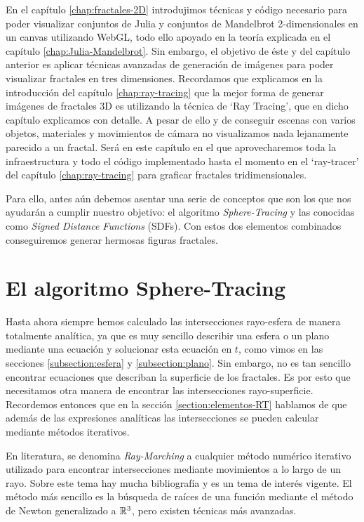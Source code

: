 %
%

En el capítulo \ref{chap:fractales-2D} introdujimos técnicas y código necesario para poder visualizar conjuntos de Julia y conjuntos de Mandelbrot 2-dimensionales en un canvas utilizando WebGL, todo ello apoyado en la teoría explicada en el capítulo \ref{chap:Julia-Mandelbrot}. Sin embargo, el objetivo de éste y del capítulo anterior es aplicar técnicas avanzadas de generación de imágenes para poder visualizar fractales en tres dimensiones. Recordamos que explicamos en la introducción del capítulo \ref{chap:ray-tracing} que la mejor forma de generar imágenes de fractales 3D es utilizando la técnica de `Ray Tracing', que en dicho capítulo explicamos con detalle. A pesar de ello y de conseguir escenas con varios objetos, materiales y movimientos de cámara no visualizamos nada lejanamente parecido a un fractal. Será en este capítulo en el que aprovecharemos toda la infraestructura y todo el código implementado hasta el momento en el `ray-tracer' del capítulo \ref{chap:ray-tracing} para graficar fractales tridimensionales.

Para ello, antes aún debemos asentar una serie de conceptos que son los que nos ayudarán a cumplir nuestro objetivo: el algoritmo \textit{Sphere-Tracing} y las conocidas como \textit{Signed Distance Functions} (SDFs). Con estos dos elementos combinados conseguiremos generar hermosas figuras fractales.

\section{El algoritmo Sphere-Tracing}
\label{section:sphere-tracing}

Hasta ahora siempre hemos calculado las intersecciones rayo-esfera de manera totalmente analítica, ya que es muy sencillo describir una esfera o un plano mediante una ecuación y solucionar esta ecuación en $t$, como vimos en las secciones \ref{subsection:esfera} y \ref{subsection:plano}. Sin embargo, no es tan sencillo encontrar ecuaciones que describan la superficie de los fractales. Es por esto que necesitamos otra manera de encontrar las intersecciones rayo-superficie. Recordemos entonces que en la sección \ref{section:elementos-RT} hablamos de que además de las expresiones analíticas las intersecciones se pueden calcular mediante métodos iterativos. 

En literatura, se denomina \textit{Ray-Marching} a cualquier método numérico iterativo utilizado para encontrar intersecciones mediante movimientos a lo largo de un rayo. Sobre este tema hay mucha bibliografía y es un tema de interés vigente. El método más sencillo es la búsqueda de raíces de una función mediante el método de Newton generalizado a $\mathbb{R}^3$, pero existen técnicas más avanzadas. 

